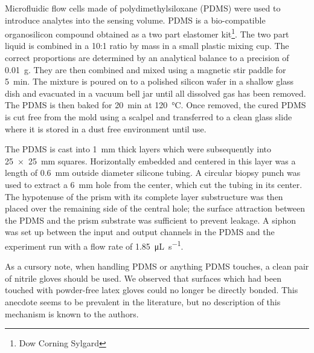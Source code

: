 Microfluidic flow cells made of polydimethylsiloxane (PDMS) were used to
introduce analytes into the sensing volume.  PDMS is a bio-compatible
organosilicon compound obtained as a two part elastomer kit\footnote{Dow
Corning Sylgard}.  The two part liquid is combined in a
10:1 ratio by mass in a small plastic mixing cup.  The correct proportions
are determined by an analytical balance to a precision of \SI{0.01}{\gram}.
They are then combined and mixed using a magnetic stir paddle for
\SI{5}{\minute}.  The mixture is poured on to a polished silicon wafer in a
shallow glass dish and evacuated in a vacuum bell jar until all dissolved
gas has been removed.  The PDMS is then baked for \SI{20}{\minute} at
\SI{120}{\celsius}.  Once removed, the cured PDMS is cut free from the mold
using a scalpel and transferred to a clean glass slide where it is stored
in a dust free environment until use.

The PDMS is cast into \SI{1}{\milli\meter} thick layers which were
subsequently into \SI{25x25}{\milli\meter} squares.  Horizontally embedded
and centered in this layer was a length of \SI{0.6}{\milli\meter} outside
diameter silicone tubing.  A circular biopsy punch was used to extract a
\SI{6}{\milli\meter} hole from the center, which cut the tubing in its
center.  The hypotenuse of the prism with its complete layer substructure
was then placed over the remaining side of the central hole; the surface
attraction between the PDMS and the prism substrate was sufficient to
prevent leakage.  A siphon was set up between the input and output channels
in the PDMS and the experiment run with a flow rate of
\SI{1.85}{\micro\liter\per\second}.  

As a cursory note, when handling PDMS or anything PDMS touches, a clean
pair of nitrile gloves should be used.  We observed that surfaces which had
been touched with powder-free latex gloves could no longer be directly
bonded.  This anecdote seems to be prevalent in the literature, but no
description of this mechanism is known to the authors.
